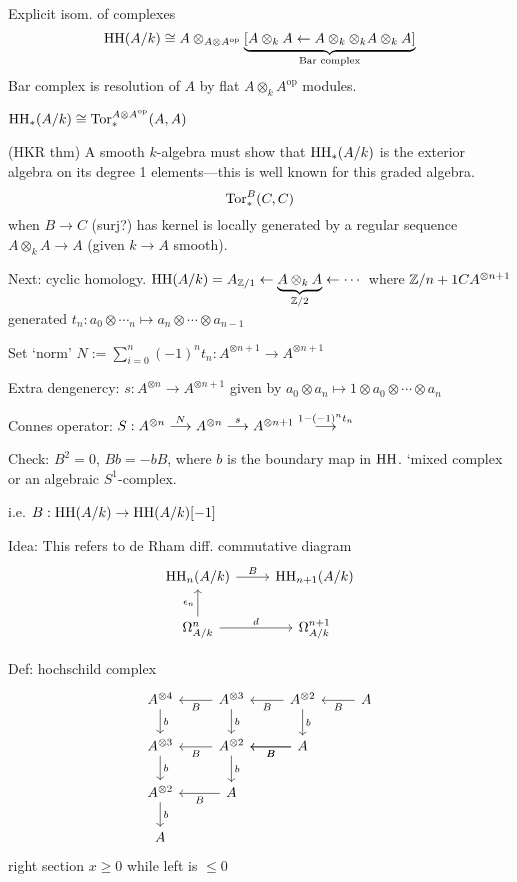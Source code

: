 \pf Explicit isom. of complexes
	\[
	\operatorname{HH}(A/k) \cong A \otimes_{A \otimes A^\text{op}} \underbrace{[A \otimes_k A \leftarrow A \otimes_k \otimes_k A \otimes_k A]}_{\text{Bar complex}}
	\]
Bar complex is resolution of $A$ by flat $A \otimes_k A^\text{op}$ modules. 

\begin{cor}
$\operatorname{HH}_*(A/k) \cong \operatorname{Tor}_*^{A \otimes A^\text{op}}(A,A)$
\end{cor}



\pf (HKR thm) A smooth $k$-algebra must show that $\operatorname{HH}_*(A/k)$ is the exterior algebra on its degree 1 elements---this is well known for this graded algebra.
	\[
	\operatorname{Tor}_*^B(C,C)
	\]
when $B \to C$ (surj?) has kernel is locally generated by a regular sequence $A \otimes_k A \to A$ (given $k \to A$ smooth). 


Next: cyclic homology.
$\operatorname{HH}(A/k)= A_{\mathbb{Z}/1} \leftarrow \underbrace{A \otimes_k A}_{\mathbb{Z}/2} \leftarrow \cdots$
where $\mathbb{Z}/n+1 C A^{\otimes n+1}$
generated $t_n: a_0 \otimes \cdots_n \mapsto a_n \otimes \cdots \otimes a_{n-1}$

Set `norm' $N:= \sum_{i=0}^n (-1)^n t_n: A^{\otimes n+1} \to A^{\otimes n+1}$

Extra dengenercy: $s: A^{\otimes n} \to A^{\otimes n+1}$ given by $a_0 \otimes a_n \mapsto 1 \otimes a_0 \otimes \cdots \otimes a_n$

Connes operator: $S: A^{\otimes n} \stackrel{N}{\longrightarrow} A^{\otimes n} \stackrel{s}{\longrightarrow} A^{\otimes n+1} \stackrel{1-(-1)^n t_n}{\longrightarrow}$

Check: $B^2=0$, $Bb= -bB$, where $b$ is the boundary map in $\operatorname{HH}$. 
`mixed complex or an algebraic $S^1$-complex. 


i.e. $B: \operatorname{HH}(A/k) \to \operatorname{HH}(A/k)[-1]$

Idea: This refers to de Rham diff. commutative diagram
	\[
	\begin{tikzcd}
	\hh_n(A/k) \arrow{r}{B} & \hh_{n+1}(A/k) \\
	\Omega_{A/k}^n \arrow{u}{\epsilon_n} \arrow{r}{d} & \Omega_{A/k}^{n+1}
	\end{tikzcd}
	\]

Def: hochschild complex
	\[
	\begin{tikzcd}
	A^{\otimes 4} \arrow{d}{b} & A^{\otimes 3} \arrow{d}{b} \arrow{l}{B} & A^{\otimes 2} \arrow{d}{b} \arrow{l}{B} & A \arrow{l}{B} \\
	A^{\otimes 3} \arrow{d}{b} & A^{\otimes 2} \arrow{d}{b} \arrow{l}{B} & A \arrow{l}{B} \arrow{l}{B}  & \\
	A^{\otimes 2} \arrow{d}{b} & A \arrow{l}{B} \\
	A 
	\end{tikzcd}
	\]
right section $x \geq 0$ while left is $\leq 0$

